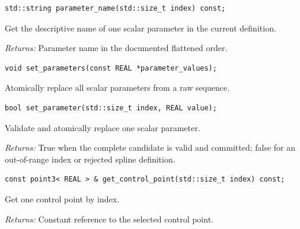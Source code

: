\par\noindent\begin{minipage}{\linewidth}
\begin{lstlisting}[style=apireference]
std::string parameter_name(std::size_t index) const;
\end{lstlisting}
{\footnotesize Get the descriptive name of one scalar parameter in the current definition.\par}
{\footnotesize\textit{Returns:} Parameter name in the documented flattened order.\par}
\end{minipage}\par\vspace{1pt}
\par\noindent\begin{minipage}{\linewidth}
\begin{lstlisting}[style=apireference]
void set_parameters(const REAL *parameter_values);
\end{lstlisting}
{\footnotesize Atomically replace all scalar parameters from a raw sequence.\par}
\end{minipage}\par\vspace{1pt}
\par\noindent\begin{minipage}{\linewidth}
\begin{lstlisting}[style=apireference]
bool set_parameter(std::size_t index, REAL value);
\end{lstlisting}
{\footnotesize Validate and atomically replace one scalar parameter.\par}
{\footnotesize\textit{Returns:} True when the complete candidate is valid and committed; false for an out-of-range index or rejected spline definition.\par}
\end{minipage}\par\vspace{1pt}
\par\noindent\begin{minipage}{\linewidth}
\begin{lstlisting}[style=apireference]
const point3< REAL > & get_control_point(std::size_t index) const;
\end{lstlisting}
{\footnotesize Get one control point by index.\par}
{\footnotesize\textit{Returns:} Constant reference to the selected control point.\par}
\end{minipage}\par\vspace{1pt}
